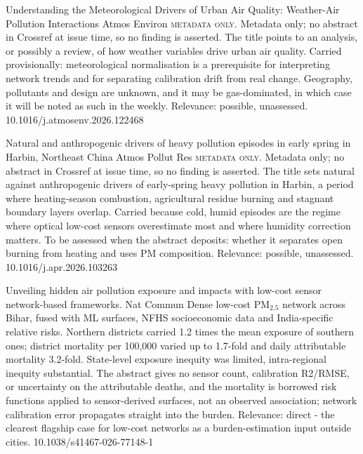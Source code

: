 \documentclass[10pt]{article}
\begin{document}
{Understanding the Meteorological Drivers of Urban Air Quality: Weather-Air Pollution Interactions}
{Atmos Environ}
{\textsc{metadata only.} Metadata only; no abstract in Crossref at issue time, so no finding is asserted. The title points to an analysis, or possibly a review, of how weather variables drive urban air quality. Carried provisionally: meteorological normalisation is a prerequisite for interpreting network trends and for separating calibration drift from real change. Geography, pollutants and design are unknown, and it may be gas-dominated, in which case it will be noted as such in the weekly. Relevance: possible, unassessed.}
{10.1016/j.atmosenv.2026.122468}

{Natural and anthropogenic drivers of heavy pollution episodes in early spring in Harbin, Northeast China}
{Atmos Pollut Res}
{\textsc{metadata only.} Metadata only; no abstract in Crossref at issue time, so no finding is asserted. The title sets natural against anthropogenic drivers of early-spring heavy pollution in Harbin, a period where heating-season combustion, agricultural residue burning and stagnant boundary layers overlap. Carried because cold, humid episodes are the regime where optical low-cost sensors overestimate most and where humidity correction matters. To be assessed when the abstract deposits: whether it separates open burning from heating and uses PM composition. Relevance: possible, unassessed.}
{10.1016/j.apr.2026.103263}

\par{}\baselineskip{}\baselineskip
{}

{Unveiling hidden air pollution exposure and impacts with low-cost sensor network-based frameworks.}
{Nat Commun}
{Dense low-cost PM$_{2.5}$ network across Bihar, fused with ML surfaces, NFHS socioeconomic data and India-specific relative risks. Northern districts carried 1.2 times the mean exposure of southern ones; district mortality per 100,000 varied up to 1.7-fold and daily attributable mortality 3.2-fold. State-level exposure inequity was limited, intra-regional inequity substantial. The abstract gives no sensor count, calibration R2/RMSE, or uncertainty on the attributable deaths, and the mortality is borrowed risk functions applied to sensor-derived surfaces, not an observed association; network calibration error propagates straight into the burden. Relevance: direct - the clearest flagship case for low-cost networks as a burden-estimation input outside cities.}
{10.1038/s41467-026-77148-1}
\end{document}
